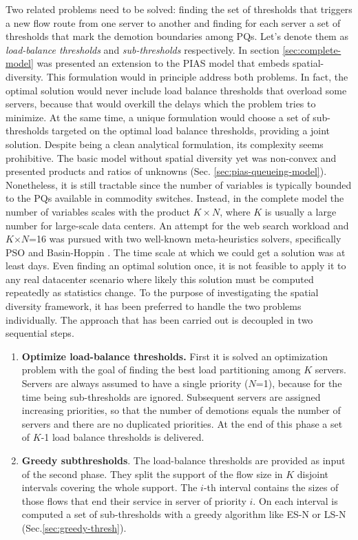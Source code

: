 Two related problems need to be solved: finding the set of thresholds that triggers a new flow route from one server to another and finding for each server a set of thresholds that mark the demotion boundaries among PQs. Let's denote them as \emph{load-balance thresholds} and \emph{sub-thresholds} respectively.
In section \ref{sec:complete-model} was presented an extension to the PIAS model that embeds spatial-diversity. This formulation would in principle address both problems. In fact, the optimal solution would never include load balance thresholds that overload some servers, because that would overkill the delays which the problem tries to minimize. At the same time, a unique formulation would choose a set of sub-thresholds targeted on the optimal load balance thresholds, providing a joint solution.  Despite being a clean analytical formulation, its complexity seems prohibitive. The basic model without spatial diversity yet was non-convex and presented products and ratios of unknowns (Sec. \ref{sec:pias-queueing-model}). Nonetheless, it is still tractable since the number of variables is typically bounded to the PQs available in commodity switches. Instead, in the complete model the number of variables scales with the product $K \times N$, where $K$ is usually a large number for large-scale data centers. An attempt for the web search workload and $K$$\times$$N$=16 was pursued with two well-known meta-heuristics solvers, specifically PSO \cite{pso,pso2} and Basin-Hoppin \cite{basinhoppin}. The time scale at which we could get a solution was at least days. Even finding an optimal solution once, it is not feasible to apply it to any real datacenter scenario where likely this solution must be computed repeatedly as statistics change.
To the purpose of investigating the spatial diversity framework, it has been preferred to handle the two problems individually. The approach that has been carried out is decoupled in two sequential steps.
\begin{enumerate}
	\item \textbf{Optimize load-balance thresholds.} First it is solved an optimization problem with the goal of finding the best load partitioning among $K$ servers. Servers are always assumed to have a single priority ($N$=1), because for the time being sub-thresholds are ignored. Subsequent servers are assigned increasing priorities, so that the number of demotions equals the number of servers and there are no duplicated priorities. At the end of this phase a set of $K$-1 load balance thresholds is delivered.
	\item \textbf{Greedy subthresholds}. The load-balance thresholds are provided as input of the second phase. They split the support of the flow size in $K$ disjoint intervals covering the whole support. The $i$-th interval contains the sizes of those flows that end their service in server of priority $i$. On each interval is computed a set of sub-thresholds with a greedy algorithm like ES-N or LS-N (Sec.\ref{sec:greedy-thresh}).  
\end{enumerate}
